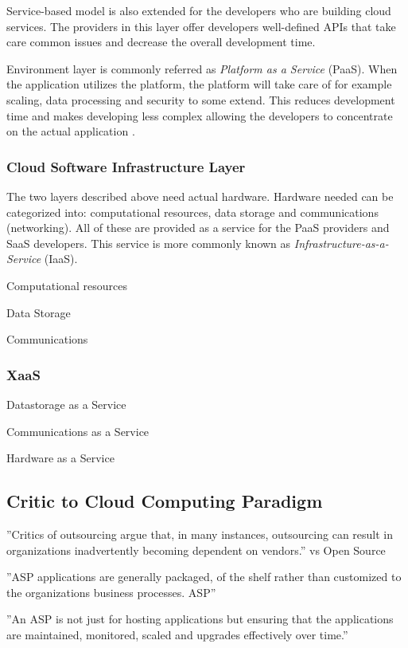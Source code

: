 \documentclass{tktltiki}
\begin{document}
Service-based model is also extended for the developers who are building cloud services.  The providers in this layer offer developers well-defined APIs that take care common issues and decrease the overall development time.

Environment layer is commonly referred as \emph{Platform as a Service} (PaaS).  When the application utilizes the platform, the platform will take care of for example scaling, data processing and security to some extend.  This reduces development time and makes developing less complex allowing the developers to concentrate on the actual application \cite{unified_ontology}.


\subsubsection{Cloud Software Infrastructure Layer}


The two layers described above need actual hardware. Hardware needed can be categorized into: computational resources, data storage and communications (networking).  All of these are provided as a service for the PaaS providers and SaaS developers.  This service is more commonly known as \emph{Infrastructure-as-a-Service} (IaaS).

Computational resources

Data Storage

Communications


\subsubsection{XaaS}

Datastorage as a Service

Communications as a Service

Hardware as a Service


\subsection{Critic to Cloud Computing Paradigm}


''Critics of outsourcing argue that, in many instances, outsourcing can result in organizations inadvertently becoming dependent on vendors.'' vs Open Source

''ASP applications are generally packaged, of the shelf rather than customized to the organizations business processes. ASP''

''An ASP is not just for hosting applications but ensuring that the applications are maintained, monitored, scaled and upgrades effectively over time.''
\end{document}
